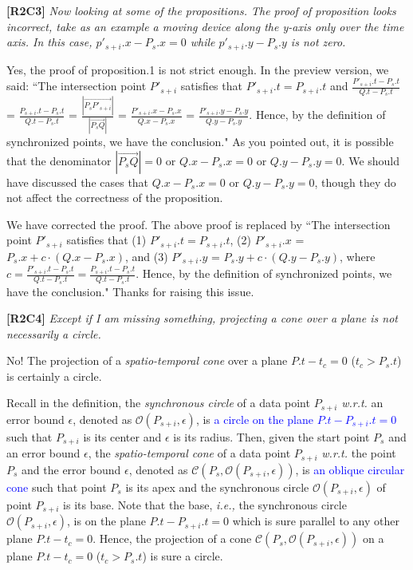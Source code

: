 \documentclass{letter}
\newcommand{\ie}{\emph{i.e.,}\xspace}
\newcommand{\wrt}{\emph{w.r.t.}\xspace}
\newcommand{\cone}[1]{{$\mathcal{C}{#1}$}}
\renewcommand{\circle}[1]{{$\mathcal{O}{#1}$}}
\begin{document}
\textbf{[R2C3]} \emph{Now looking at some of the propositions.
The proof of proposition looks incorrect, take as an example a moving device along the y-axis only over the time axis. In this case, $p'_{s+i}.x - P_s.x = 0$ while $p'_{s+i}.y - P_s.y$ is not zero.
}

Yes, the proof of proposition.1 is not strict enough. In the preview version, we said:
``The intersection point $P'_{s+i}$ satisfies that $P'_{s+i}.t = P_{s+i}.t$ and
$\frac{P'_{s+i}.t - P_{s}.t}{Q.t - P_{s}.t}$ = $\frac{P_{s+i}.t - P_{s}.t}{Q.t - P_{s}.t}$  =
$\frac{|\overrightarrow{P_sP'_{s+i}}|}{|\overrightarrow{P_sQ}|}$ =
$\frac{P'_{s+i}.x - P_{s}.x}{Q.x - P_{s}.x}$ =
$\frac{P'_{s+i}.y - P_{s}.y}{Q.y - P_{s}.y}$.
Hence, by the definition of synchronized points, we have the conclusion."
As you pointed out, it is possible that the denominator $|\overrightarrow{P_sQ}|=0$ or $Q.x - P_{s}.x=0$ or $Q.y - P_{s}.y=0$. We should have discussed the cases that $Q.x - P_{s}.x=0$ or $Q.y - P_{s}.y=0$, though they do not affect the correctness of the proposition.

We have corrected the proof. The above proof is replaced by
``The intersection point $P'_{s+i}$ satisfies that
(1) $P'_{s+i}.t = P_{s+i}.t$,
(2) $P'_{s+i}.x$ = $P_s.x +  c\cdot(Q.x - P_s.x)$, and
(3) $P'_{s+i}.y$ = $P_s.y +  c\cdot(Q.y - P_s.y)$,
where $c= \frac{P'_{s+i}.t - P_{s}.t}{Q.t - P_{s}.t}= \frac{P_{s+i}.t-P_s.t}{Q.t-P_s.t}$.
Hence, by the definition of synchronized points, we have the conclusion."
Thanks for raising this issue.


\textbf{[R2C4]} \emph{Except if I am missing something, projecting a cone over a plane is not necessarily a circle.}

No! The projection of a \emph{spatio-temporal cone} over a plane $P.t- t_c = 0$ ($t_c > P_s.t$) is certainly a circle.

Recall in the definition, the \emph{synchronous circle} of a data point $P_{s+i}$ \wrt an error bound $\epsilon$, denoted as \circle{(P_{s+i}, \epsilon)}, is \textcolor{blue}{a circle on the plane $P.t-P_{s+i}.t = 0$} such that $P_{s+i}$ is its center and $\epsilon$ is its radius.
%
Then, given the start point $P_s$ and an error bound $\epsilon$, the \emph{spatio-temporal cone} of a data point $P_{s+i}$ \wrt the point $P_s$ and the error bound $\epsilon$, denoted as \cone{(P_s, \mathcal{O}(P_{s+i}, \epsilon))}, is \textcolor{blue}{an oblique circular cone} such that point $P_s$ is its apex and the synchronous circle $\mathcal{O}(P_{s+i}, \epsilon)$ of point $P_{s+i}$ is its base. Note that the base, \ie the synchronous circle $\mathcal{O}(P_{s+i}, \epsilon)$, is on the plane $P.t-P_{s+i}.t = 0$ which is sure parallel to any other plane $P.t- t_c = 0$. Hence, the  projection of a cone \cone{(P_s, \mathcal{O}(P_{s+i}, \epsilon))} on a plane $P.t- t_c = 0$ ($t_c > P_s.t$) is sure a circle.
\end{document}
